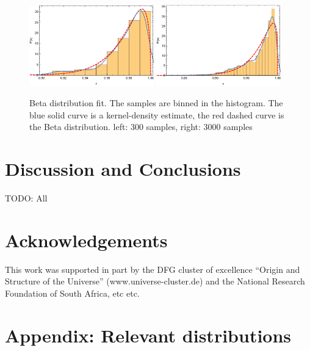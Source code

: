 \documentclass[11pt]{article}
\begin{document}
\begin{figure}[h]
  \centering
  \includegraphics[width=0.48\textwidth]{beta-300}
  \includegraphics[width=0.48\textwidth]{beta-3000}
  \caption{Beta distribution fit. The samples are binned in the
    histogram. The blue solid curve is a kernel-density estimate, the
    red dashed curve is the Beta distribution. left: 300 samples,
    right: 3000 samples}
  \label{fig:beta}
\end{figure}

\section{Discussion and Conclusions}

TODO: All

\section*{Acknowledgements}

This work was supported in part by the DFG cluster of excellence
``Origin and Structure of the Universe'' (www.universe-cluster.de) and
the National Research Foundation of South Africa, etc etc.

\section{Appendix: Relevant distributions}
\end{document}
